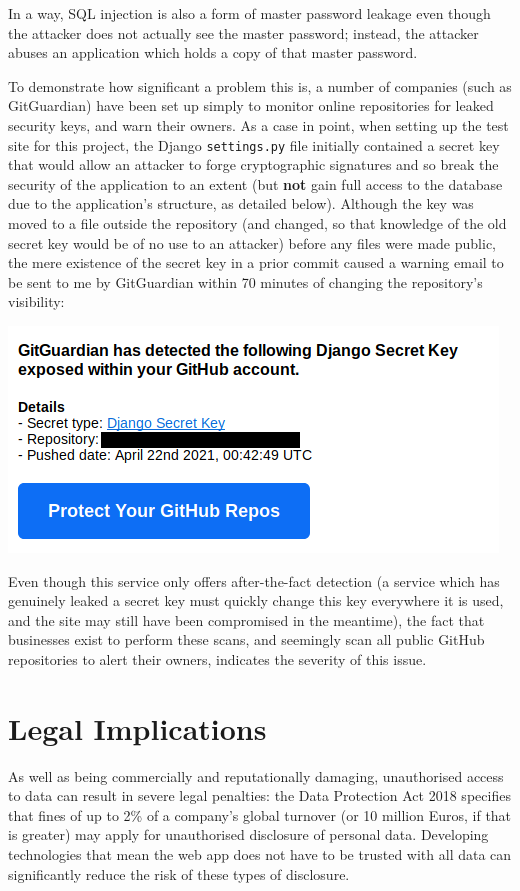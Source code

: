 \documentclass[12pt]{report}
\begin{document}
In a way, SQL injection is also a form of master password leakage even though the attacker does not actually see the master password; instead, the attacker abuses an application which holds a copy of that master password.

To demonstrate how significant a problem this is, a number of companies (such as GitGuardian\cite{GitGuardian}) have been set up simply to monitor online repositories for leaked security keys, and warn their owners. As a case in point, when setting up the test site for this project, the Django \texttt{settings.py} file initially contained a secret key that would allow an attacker to forge cryptographic signatures and so break the security of the application to an extent (but \textbf{not} gain full access to the database due to the application's structure, as detailed below). Although the key was moved to a file outside the repository (and changed, so that knowledge of the old secret key would be of no use to an attacker) before any files were made public, the mere existence of the secret key in a prior commit caused a warning email to be sent to me by GitGuardian within 70 minutes of changing the repository's visibility:

\begin{center}
  \includegraphics[scale=0.5]{01-gitguardian.png}
\end{center}

Even though this service only offers after-the-fact detection (a service which has genuinely leaked a secret key must quickly change this key everywhere it is used, and the site may still have been compromised in the meantime), the fact that businesses exist to perform these scans, and seemingly scan all public GitHub repositories to alert their owners, indicates the severity of this issue.

\section{Legal Implications}
As well as being commercially and reputationally damaging, unauthorised access to data can result in severe legal penalties: the Data Protection Act 2018 specifies that fines of up to 2\% of a company's global turnover (or 10 million Euros, if that is greater) may apply for unauthorised disclosure of personal data\cite{GDPR}. Developing technologies that mean the web app does not have to be trusted with all data can significantly reduce the risk of these types of disclosure.
\end{document}
